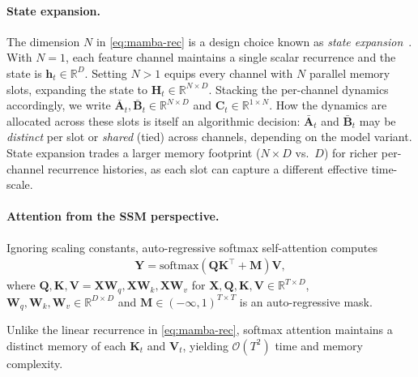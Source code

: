 \documentclass{article}
\begin{document}
\paragraph{State expansion.}
The dimension $N$ in \cref{eq:mamba-rec} is a design choice known as
\emph{state expansion}~\cite{gupta2022simplifying,poli2024mad,yu2025block}.
With $N{=}1$, each feature channel maintains a single scalar recurrence and the
state is $\mathbf{h}_t\in\mathbb{R}^{D}$.
Setting $N{>}1$ equips every channel with $N$ parallel memory slots, expanding
the state to $\mathbf{H}_t\in\mathbb{R}^{N\times D}$.
Stacking the per-channel dynamics accordingly, we write
$\bar{\mathbf{A}}_t,\bar{\mathbf{B}}_t\!\in\!\mathbb{R}^{N\times D}$
and $\mathbf{C}_t\!\in\!\mathbb{R}^{1\times N}$.
How the dynamics are allocated across these slots is itself an algorithmic
decision: $\bar{\mathbf{A}}_t$ and $\bar{\mathbf{B}}_t$ may be \emph{distinct}
per slot or \emph{shared} (tied) across channels, depending on the model variant.
State expansion trades a larger memory footprint ($N{\times}D$ vs.\ $D$) for
richer per-channel recurrence histories, as each slot can capture a different
effective time-scale.

\paragraph{Attention from the SSM perspective.}
Ignoring scaling constants, auto-regressive softmax self-attention computes
\begin{align}
\mathbf{Y} = \mathrm{softmax}(\mathbf{Q}\mathbf{K}^\top + \mathbf{M})\mathbf{V},
\end{align}
where $\mathbf{Q},\mathbf{K},\mathbf{V}=\mathbf{X}\mathbf{W}_q,\mathbf{X}\mathbf{W}_k,\mathbf{X}\mathbf{W}_v$ for $\mathbf{X},\mathbf{Q},\mathbf{K},\mathbf{V}\in\mathbb{R}^{T\times D}$, $\mathbf{W}_q, \mathbf{W}_k, \mathbf{W}_v \in \mathbb{R}^{D \times D}$ and $\mathbf{M} \in (- \infty, 1)^{T \times T}$ is an auto-regressive mask.

Unlike the linear recurrence in \cref{eq:mamba-rec}, softmax attention maintains a distinct memory of each $\mathbf{K}_t$ and $\mathbf{V}_t$, yielding $\mathcal{O}(T^2)$ time and memory complexity.   
\end{document}
